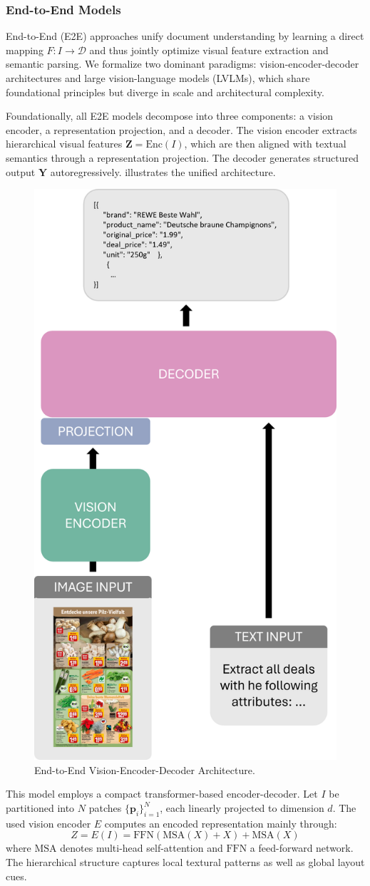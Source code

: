 \documentclass[11pt]{article}
\begin{document}
\subsubsection{End-to-End Models}  
End-to-End (E2E) approaches unify document understanding by learning a direct mapping $ F: I \to \mathcal{D} $ and thus jointly optimize visual feature extraction and semantic parsing. We formalize two dominant paradigms: vision-encoder-decoder architectures and large vision-language models (LVLMs), which share foundational principles but diverge in scale and architectural complexity.

Foundationally, all E2E models decompose into three components: a vision encoder, a representation projection, and a decoder. The vision encoder extracts hierarchical visual features $ \mathbf{Z} = \text{Enc}(I) $, which are then aligned with textual semantics through a representation projection. The decoder generates structured output $ \mathbf{Y} $ autoregressively.  illustrates the unified architecture.

\begin{figure}[h!]
    \centering
    \includegraphics[width=0.5\linewidth]{figures/vlm_arch.png}
    \caption{End-to-End Vision-Encoder-Decoder Architecture.}
    \label{fig:e2e_arch}
\end{figure}

 This model employs a compact transformer-based encoder-decoder. Let $ I $ be partitioned into $ N $ patches $ \{\mathbf{p}_i\}_{i=1}^N $, each linearly projected to dimension $ d $.  The used vision encoder $E$ computes an encoded representation mainly through:
\begin{equation}
Z = E(I) = \text{FFN}(\text{MSA}(X) + X) + \text{MSA}(X)
\end{equation}  
where $\text{MSA}$ denotes multi-head self-attention and $\text{FFN}$ a feed-forward network. The hierarchical structure captures local textural patterns as well as global layout cues.  
\end{document}
